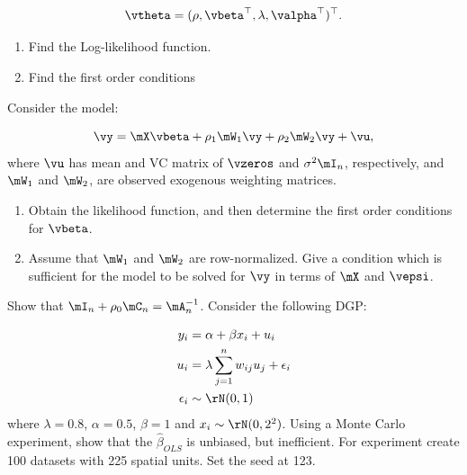 \documentclass[english,12pt]{book}\usepackage[]{graphicx}\usepackage[]{xcolor}
\begin{document}
\begin{exercises}
	\begin{equation}
		\vtheta = (\rho, \vbeta^\top, \lambda, \valpha^\top)^\top.
	\end{equation}
	
   \begin{enumerate}
     \item Find the Log-likelihood function.
     \item Find the first order conditions
   \end{enumerate}
 
 \exercise Consider the model:

\begin{equation}
	\vy = \mX\vbeta + \rho_1\mW_1\vy + \rho_2\mW_2\vy + \vu,
\end{equation}
%
where $\vu$ has mean and VC matrix of $\vzeros$ and $\sigma^2\mI_n$, respectively, and $\mW_1$ and $\mW_2$, are observed exogenous weighting matrices. 
   \begin{enumerate}
    \item Obtain the likelihood function, and then determine the first order conditions for $\vbeta$.
    \item Assume that $\mW_1$ and $\mW_2$ are row-normalized. Give a condition which is sufficient for the model to be solved for $\vy$ in terms of $\mX$ and $\vepsi$.
   \end{enumerate}
   
   \exercise  Show that $\mI_n + \rho_0\mC_n = \mA_n^{-1}$.
   \exercise  Consider the following DGP:

\begin{equation}
	\begin{aligned}
		y_i & = \alpha + \beta x_i + u_i \\
		u_i & = \lambda \sum_{j =  1}^n w_{ij}u_{j} + \epsilon_i \\
		\epsilon_i &\sim \rN(0, 1) 
	\end{aligned}
\end{equation}
%
where $\lambda = 0.8$, $\alpha = 0.5$, $\beta = 1$ and $x_i \sim \rN(0, 2^2)$. Using a Monte Carlo experiment, show that the $\widehat{\beta}_{OLS}$ is unbiased, but inefficient. For experiment create 100 datasets with 225 spatial units. Set the seed at 123.


\end{exercises}   
    
    
\end{document}
